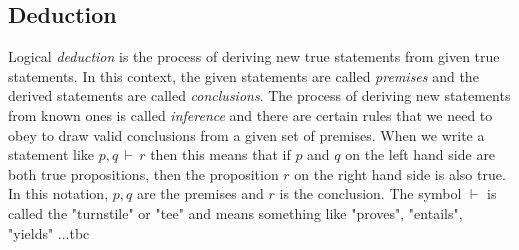 



\subsection{Deduction}
Logical \emph{deduction} is the process of deriving new true statements from given true statements. In this context, the given statements are called \emph{premises} and the derived statements are called \emph{conclusions}. The process of deriving new statements from known ones is called \emph{inference} and there are certain rules that we need to obey to draw valid conclusions from a given set of premises. When we write a statement like $p,q \,\vdash\, r$ then this means that if $p$ and $q$ on the left hand side are both true propositions, then the proposition $r$ on the right hand side is also true. In this notation, $p,q$ are the premises and $r$ is the conclusion. The symbol $\vdash$ is called the "turnstile" or "tee" and means something like "proves", "entails", "yields"  ...tbc





